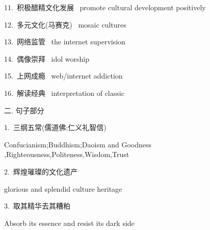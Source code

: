 \documentclass[a4paper, 12pt]{article}
\begin{document}
\begin{multicols}{2}
\begin{flushleft}
11.\ 积极醋精文化发展 \ promote cultural development positively
\end{flushleft}

\begin{flushleft}
12.\ 多元文化(马赛克) \ mosaic cultures
\end{flushleft}
\end{multicols}

\begin{multicols}{2}
\begin{flushleft}
13.\ 网络监管 \ the internet supervision
\end{flushleft}

\begin{flushleft}
14.\ 偶像崇拜 \ idol worship
\end{flushleft}
\end{multicols}

\begin{multicols}{2}
\begin{flushleft}
15.\ 上网成瘾 \ web/internet addiction
\end{flushleft}

\begin{flushleft}
16.\ 解读经典 \ interpretation of classic
\end{flushleft}
\end{multicols}

\begin{flushleft}
二. 句子部分
\end{flushleft}

\begin{flushleft}
1.\ 三纲五常(儒道佛;仁义礼智信)

Confucianism;Buddhism;Daoism and Goodness ,Righteousness,Politeness,Wisdom,Trust
\end{flushleft}

\begin{flushleft}
2.\ 辉煌璀璨的文化遗产

glorious and splendid culture heritage
\end{flushleft}

\begin{flushleft}
3.\ 取其精华去其糟粕

Absorb its essence and resist its dark side
\end{flushleft}
\end{document}
